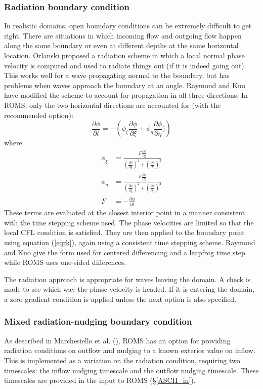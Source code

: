 \subsubsection{Radiation boundary condition}
In realistic domains, open boundary conditions can be extremely
difficult to get right. There are situations in which incoming flow and
outgoing flow happen along the same boundary or even at different
depths at the same horizontal location. Orlanski \cite{Orlanski76}
proposed a radiation scheme in which a local normal phase velocity is
computed and used to radiate things out (if it is indeed going out).
This works well for a wave propagating normal to the boundary, but
has problems when waves approach the boundary at an angle. Raymond
and Kuo \cite{Raymond84} have modified the scheme to account for
propagation in all three directions. In ROMS, only the two horizontal
directions are accounted for (with the recommended 
option):
\begin{equation}
   \frac{\partial \phi}{\partial t} = - \left( \phi_\xi \frac{\partial
   \phi}{\partial \xi} + \phi_\eta \frac{\partial \phi}{\partial \eta}) \right)
\label{eqrk}
\end{equation}
where
\begin{align}
   \phi_\xi & = \frac{F \frac{\partial \phi}{\partial \xi}}{
   \left( \frac{\partial \phi}{\partial \xi} \right)^2 +
   \left( \frac{\partial \phi}{\partial \eta} \right)^2 } \\
   \phi_\eta & = \frac{F \frac{\partial \phi}{\partial \eta}}{
   \left( \frac{\partial \phi}{\partial \xi} \right)^2 +
   \left( \frac{\partial \phi}{\partial \eta} \right)^2 } \\
   F & = - \frac{\partial \phi}{\partial t}
\end{align}
These terms are evaluated at the closest interior point in a manner
consistent with the time stepping scheme used. The phase velocities are
limited so that the local CFL condition is satisfied. They are then
applied to the boundary point using equation (\ref{eqrk}), again using
a consistent time stepping scheme. Raymond and Kuo give the form used
for centered differencing and a leapfrog time step while ROMS uses
one-sided differences.

The radiation approach is appropriate for waves leaving the domain. A
check is made to see which way the phase velocity is headed. If it is
entering the domain, a zero gradient condition is applied unless the next
option is also specified.

\subsubsection{Mixed radiation-nudging boundary condition}
As described in Marchesiello et al. (\cite{Marchesiello2001}), ROMS has an option for providing
radiation conditions on outflow and nudging to a known exterior
value on inflow. This is implemented as a variation on the radiation
condition, requiring two timescales: the inflow nudging timescale and the
outflow nudging timescale. These timescales are provided in the input to
ROMS (\S\ref{ASCII_in}).

